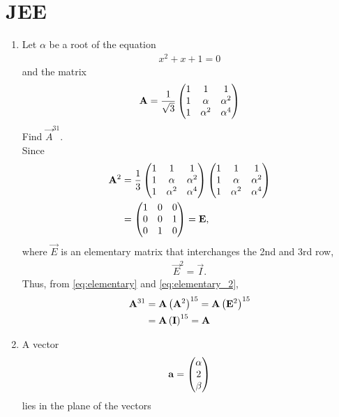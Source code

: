 \documentclass[journal,12pt,twocolumn]{IEEEtran}
\renewcommand\thesection{\arabic{section}}
\begin{document}
\section{JEE}
\renewcommand{\theequation}{\theenumi}
\begin{enumerate}[label=\thesection.\arabic*.,ref=\thesection.\theenumi]
\item Let $\alpha$ be a root of the equation
\begin{align}
	x^2+x+1 = 0
\end{align}
and the matrix 
\begin{align}
	\mathbf{A} = 	\frac{1}{\sqrt{3}}\begin{pmatrix}1 & 1 & 1\\ 1 & \alpha &  \alpha^2 \\ 1 & \alpha^2  & \alpha^{4}\end{pmatrix} 
\end{align}
		Find $\vec{A}^{31}$.
		\\
		\solution Since 
\begin{align}
	\mathbf{A}^2 &= 	\frac{1}{3}\begin{pmatrix}1 & 1 & 1\\ 1 & \alpha &  \alpha^2 \\ 1 & \alpha^2  & \alpha^{4}\end{pmatrix} \begin{pmatrix}1 & 1 & 1\\ 1 & \alpha &  \alpha^2 \\ 1 & \alpha^2  & \alpha^{4}\end{pmatrix}
	\\
	&= 	\begin{pmatrix}1 & 0 & 0\\ 0 & 0 & 1 \\ 0 & 1 & 0 \end{pmatrix} = \mathbf{E},
	\label{eq:elementary}
\end{align}
		where $\vec{E}$ is an elementary matrix that interchanges the 2nd and 3rd row,
\begin{align}
	\vec{E}^2 = 	\vec{I}.
	\label{eq:elementary_2}
\end{align}
Thus, from 
	\eqref{eq:elementary} and
	\eqref{eq:elementary_2},
\begin{align}
	\mathbf{A}^{31} &= 	\mathbf{A}\left(\mathbf{A}^2\right)^{15} = \mathbf{A}\left(\mathbf{E}^2\right)^{15}
	\\
	&=\mathbf{A}\left(\mathbf{I}\right)^{15} = \mathbf{A}
\end{align}
	\item A vector 
\begin{align}
	\mathbf{a} = 	\begin{pmatrix}\alpha \\  2 \\ \beta \end{pmatrix}
	\label{eq:plane_bisect_given}
\end{align}
lies in the plane of the vectors 

\end{enumerate}
\end{document}
